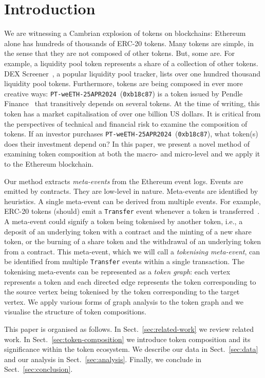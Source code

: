 \section{Introduction}\label{sec:introduction}

We are witnessing a Cambrian explosion of tokens on blockchains:
Ethereum alone has hundreds of thousands of ERC-20 tokens.  Many
tokens are simple, in the sense that they are not composed of other
tokens.  But, some are.  For example, a liquidity pool token
represents a share of a collection of other tokens.  DEX
Screener~\cite{dex-screener-xx}, a popular liquidity pool tracker,
lists over one hundred thousand liquidity pool tokens.  Furthermore,
tokens are being composed in ever more creative ways:
\texttt{PT-weETH-25APR2024}~(\texttt{0xb18c87}) is a token issued by
Pendle Finance~\cite{nguyen-vuong-22} that transitively depends on
several tokens.  At the time of writing, this token has a market
capitalisation of over one billion US dollars.  It is critical from
the perspectives of technical and financial risk to examine the
composition of tokens.  If an investor purchases
\texttt{PT-weETH-25APR2024}~(\texttt{0xb18c87}), what token(s) does
their investment depend on?  In this paper, we present a novel method
of examining token composition at both the macro- and micro-level and
we apply it to the Ethereum blockchain.


Our method extracts \textit{meta-events} from the Ethereum event logs.
Events are emitted by contracts.  They are low-level in nature.
Meta-events are identified by heuristics.  A single meta-event can be
derived from multiple events.  For example, ERC-20 tokens (should)
emit a \texttt{Transfer} event whenever a token is
transferred~\cite{vogelsteller-buterin-15}.  A meta-event could
signify a token being tokenised by another token, i.e., a deposit of
an underlying token with a contract and the minting of a new share
token, or the burning of a share token and the withdrawal of an
underlying token from a contract.  This meta-event, which we will call
a \textit{tokenising meta-event}, can be identified from multiple
\texttt{Transfer} events within a single transaction.  The tokenising
meta-events can be represented as a \textit{token graph}: each vertex
represents a token and each directed edge represents the token
corresponding to the source vertex being tokenised by the token
corresponding to the target vertex.  We apply various forms of graph
analysis to the token graph and we visualise the structure of token
compositions.

This paper is organised as follows.  In Sect.~\ref{sec:related-work}
we review related work.  In Sect.~\ref{sec:token-composition} we
introduce token composition and its significance within the token
ecosystem.  We describe our data in Sect.~\ref{sec:data} and our
analysis in Sect.~\ref{sec:analysis}.  Finally, we conclude in
Sect.~\ref{sec:conclusion}.
